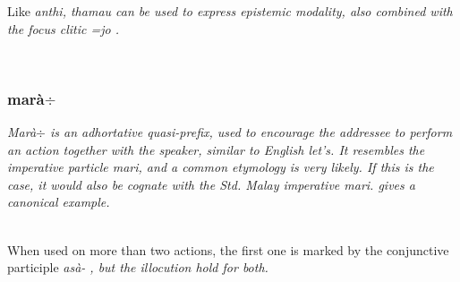 % 
%

Like \em anthi\em, \em thamau \em can be used to express epistemic modality, also combined with the focus clitic \em =jo \em {}.


 \\


% 
% 
% 
% 

\subsubsection{marà$\div$}\label{sec:morph:mara-}

\em Marà$\div$ \em is an adhortative quasi-prefix, used to encourage the addressee to perform an action together with the speaker, similar to English \em let's\em. It resembles the imperative particle \em mari\em, and a common etymology is very likely. If this is the case, it would also be cognate with the Std. Malay imperative \em mari\em.  gives a canonical example.



 \\
When used on more than two actions, the first one is marked by the conjunctive participle \em asà- \em {}, but the illocution hold for both.

